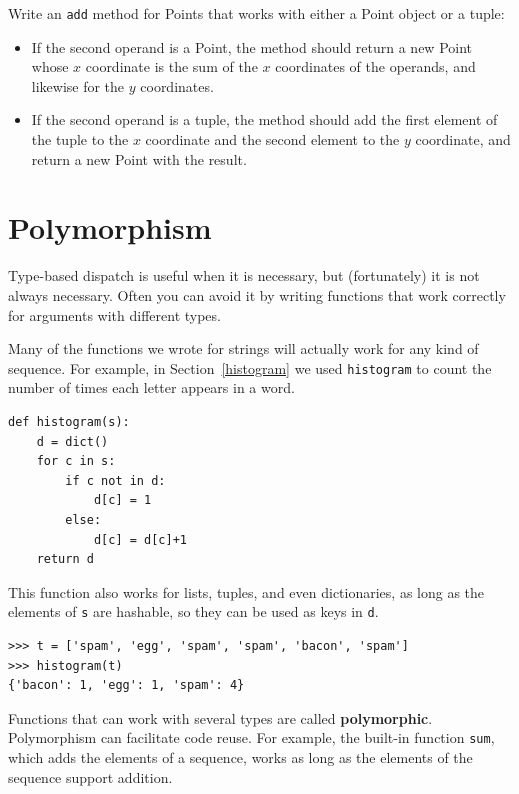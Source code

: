 \documentclass[10pt]{book}
\begin{document}
\begin{CJK}{UTF8}{gbsn}
\begin{exercise}

Write an {\tt add} method for Points that works with either a
Point object or a tuple:  

\begin{itemize}

\item If the second operand is a Point, the method should return a new
Point whose $x$ coordinate is the sum of the $x$ coordinates of the
operands, and likewise for the $y$ coordinates.

\item If the second operand is a tuple, the method should add the
first element of the tuple to the $x$ coordinate and the second
element to the $y$ coordinate, and return a new Point with the result. 

\end{itemize}

\end{exercise}

\section{Polymorphism}

Type-based dispatch is useful when it is necessary, but (fortunately)
it is not always necessary.  Often you can avoid it by writing functions
that work correctly for arguments with different types.

Many of the functions we wrote for strings will actually
work for any kind of sequence.
For example, in Section~\ref{histogram}
we used {\tt histogram} to count the number of times each letter
appears in a word.

\begin{verbatim}
def histogram(s):
    d = dict()
    for c in s:
        if c not in d:
            d[c] = 1
        else:
            d[c] = d[c]+1
    return d
\end{verbatim}
%
This function also works for lists, tuples, and even dictionaries,
as long as the elements of {\tt s} are hashable, so they can be used
as keys in {\tt d}.

\begin{verbatim}
>>> t = ['spam', 'egg', 'spam', 'spam', 'bacon', 'spam']
>>> histogram(t)
{'bacon': 1, 'egg': 1, 'spam': 4}
\end{verbatim}
%
Functions that can work with several types are called {\bf polymorphic}.
Polymorphism can facilitate code reuse.  For example, the built-in
function {\tt sum}, which adds the elements of a sequence, works
as long as the elements of the sequence support addition.


\end{CJK}
\end{document}
